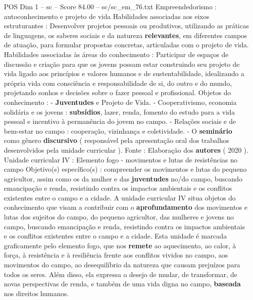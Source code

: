 \begin{textsample}{POS Dim 1 – sc – Score 84.00 – sc/sc\_em\_76.txt}
Empreendedorismo : autoconhecimento e projeto de vida Habilidades associadas aos eixos estruturantes : Desenvolver projetos pessoais ou produtivos, utilizando as práticas de linguagens, os saberes sociais e da natureza \textbf{relevantes}, em diferentes campos de atuação, para formular propostas concretas, articuladas com o projeto de vida.
Habilidades associadas às áreas do conhecimento : Participar de espaços de discussão e criação para que os jovens possam estar construindo seu projeto de vida ligado aos princípios e valores humanos e de sustentabilidade, idealizando a própria vida com consciência e responsabilidade de si, do outro e do mundo, projetando sonhos e decisões sobre o fazer pessoal e profissional.
Objetos do conhecimento : - \textbf{Juventudes} e Projeto de Vida. - Cooperativismo, economia solidária e os jovens : \textbf{subsídios}, lazer, renda, fomento do estudo para a vida pessoal e incentivo à permanência do jovem no campo. - Relações sociais e de bem-estar no campo : cooperação, vizinhança e coletividade. - O \textbf{seminário} como gênero \textbf{discursivo} ( responsável pela apresentação oral dos trabalhos desenvolvidos pela unidade curricular ).
Fonte : Elaboração dos \textbf{autores} ( 2020 ).
Unidade curricular IV : Elemento fogo - movimentos e lutas de resistências no campo Objetivo(s) específico(s) : compreender os movimentos e lutas do pequeno agricultor, assim como os da mulher e das \textbf{juventudes} no/do campo, buscando emancipação e renda, resistindo contra os impactos ambientais e os conflitos existentes entre o campo e a cidade.
A unidade curricular IV situa objetos do conhecimento que visam a contribuir com o \textbf{aprofundamento} dos movimentos e lutas dos sujeitos do campo, do pequeno agricultor, das mulheres e jovens no campo, buscando emancipação e renda, resistindo contra os impactos ambientais e os conflitos existentes entre o campo e a cidade.
Esta unidade é marcada graficamente pelo elemento fogo, que nos \textbf{remete} ao aquecimento, ao calor, à força, à resistência e à resiliência frente aos conflitos vividos no campo, aos movimentos do campo, ao desequilíbrio da natureza que causam prejuízos para todos os seres.
Além disso, ela expressa o desejo de mudar, de transformar, de novas perspectivas de renda, e também de uma vida digna no campo, \textbf{baseada} nos direitos humanos.

\end{textsample}
